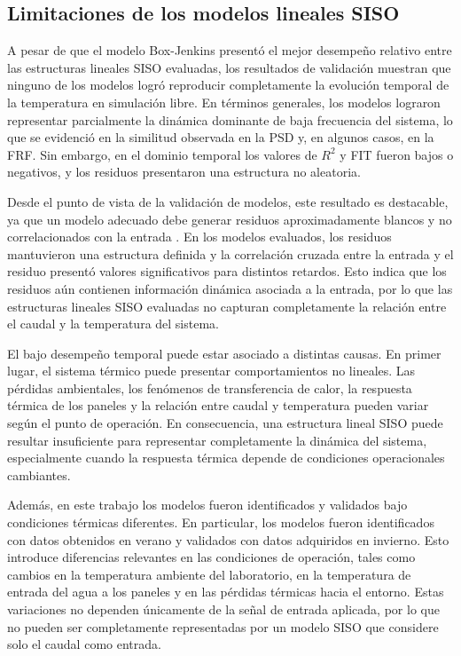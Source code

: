 \documentclass[11pt]{report}
\begin{document}
\subsection{Limitaciones de los modelos lineales SISO}

A pesar de que el modelo Box-Jenkins presentó el mejor desempeño relativo entre las estructuras lineales SISO evaluadas, los resultados de validación muestran que ninguno de los modelos logró reproducir completamente la evolución temporal de la temperatura en simulación libre. En términos generales, los modelos lograron representar parcialmente la dinámica dominante de baja frecuencia del sistema, lo que se evidenció en la similitud observada en la PSD y, en algunos casos, en la FRF. Sin embargo, en el dominio temporal los valores de $R^2$ y FIT fueron bajos o negativos, y los residuos presentaron una estructura no aleatoria.

Desde el punto de vista de la validación de modelos, este resultado es destacable, ya que un modelo adecuado debe generar residuos aproximadamente blancos y no correlacionados con la entrada \cite{ljung1999system}. En los modelos evaluados, los residuos mantuvieron una estructura definida y la correlación cruzada entre la entrada y el residuo presentó valores significativos para distintos retardos. Esto indica que los residuos aún contienen información dinámica asociada a la entrada, por lo que las estructuras lineales SISO evaluadas no capturan completamente la relación entre el caudal y la temperatura del sistema.

El bajo desempeño temporal puede estar asociado a distintas causas. En primer lugar, el sistema térmico puede presentar comportamientos no lineales. Las pérdidas ambientales, los fenómenos de transferencia de calor, la respuesta térmica de los paneles y la relación entre caudal y temperatura pueden variar según el punto de operación. En consecuencia, una estructura lineal SISO puede resultar insuficiente para representar completamente la dinámica del sistema, especialmente cuando la respuesta térmica depende de condiciones operacionales cambiantes.

Además, en este trabajo los modelos fueron identificados y validados bajo condiciones térmicas diferentes. En particular, los modelos fueron identificados con datos obtenidos en verano y validados con datos adquiridos en invierno. Esto introduce diferencias relevantes en las condiciones de operación, tales como cambios en la temperatura ambiente del laboratorio, en la temperatura de entrada del agua a los paneles y en las pérdidas térmicas hacia el entorno. Estas variaciones no dependen únicamente de la señal de entrada aplicada, por lo que no pueden ser completamente representadas por un modelo SISO que considere solo el caudal como entrada.
\end{document}
